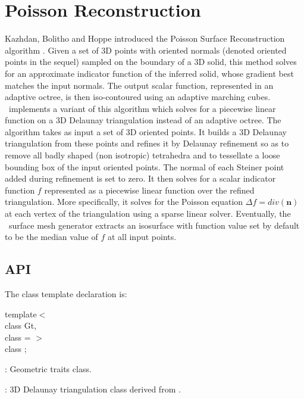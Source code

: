 \section{Poisson Reconstruction}

Kazhdan, Bolitho and Hoppe introduced the Poisson Surface Reconstruction algorithm \cite{Kazhdan06}.
Given a set of 3D points with oriented normals (denoted oriented points in the sequel)
sampled on the boundary of a 3D solid, this method solves for an approximate indicator function of the inferred solid,
whose gradient best matches the input normals. The output scalar function, represented in an adaptive octree,
is then iso-contoured using an adaptive marching cubes.\\

\cgal\ implements a variant of this algorithm which solves for a piecewise linear function
on a 3D Delaunay triangulation instead of an adaptive octree.
The algorithm takes as input a set of 3D oriented points.
It builds a 3D Delaunay triangulation from these points and refines it by Delaunay refinement
so as to remove all badly shaped (non isotropic) tetrahedra and to tessellate a loose bounding box
of the input oriented points. The normal of each Steiner point added during refinement is set to zero.
It then solves for a scalar indicator function $f$ represented as a piecewise linear function over the refined triangulation.
More specifically, it solves for the Poisson equation  $\Delta f = div(\mathbf{n})$ at each vertex of the triangulation
using a sparse linear solver.
Eventually, the \cgal\ surface mesh generator extracts an isosurface with function value set by default
to be the median value of $f$ at all input points.

\subsection{API}

The class template declaration is:

template$<$  \\
class Gt,   \\
class  = $>$   \\
class ;
\ccGlue
{}
\begin{description}
\item {}: Geometric traits class. \item {}: 3D Delaunay triangulation class derived from . \end{description}

